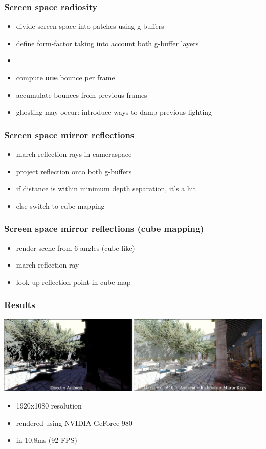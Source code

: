 \documentclass[aspectratio=169]{beamer}
\begin{document}
	\begin{frame}
		\frametitle{Screen space radiosity}
		\begin{itemize}
			\item divide screen space into patches using g-buffers
			\item define form-factor taking into account both g-buffer layers
			\item 
			\item compute \textbf{one} bounce per frame
			\item accumulate bounces from previous frames
			\item ghosting may occur: introduce ways to damp previous lighting
		\end{itemize}
	\end{frame}	

	\begin{frame}
		\frametitle{Screen space mirror reflections}
		\begin{itemize}
			\item march reflection rays in cameraspace
			\item project reflection onto both g-buffers
			\item if distance is within minimum depth separation, it's a hit
			\item else switch to cube-mapping
		\end{itemize}
	\end{frame}	

	\begin{frame}
		\frametitle{Screen space mirror reflections (cube mapping)}
		\begin{itemize}
			\item render scene from 6 angles (cube-like)
			\item march reflection ray
			\item look-up reflection point in cube-map
		\end{itemize}
	\end{frame}	

	\begin{frame}
		\frametitle{Results}
		\includegraphics[width=\textwidth]{img/deep_g_buffer_render.png}
		\begin{itemize}
			\item 1920x1080 resolution
			\item rendered using NVIDIA GeForce 980
			\item in 10.8ms (92 FPS)
		\end{itemize}
	\end{frame}
\end{document}

